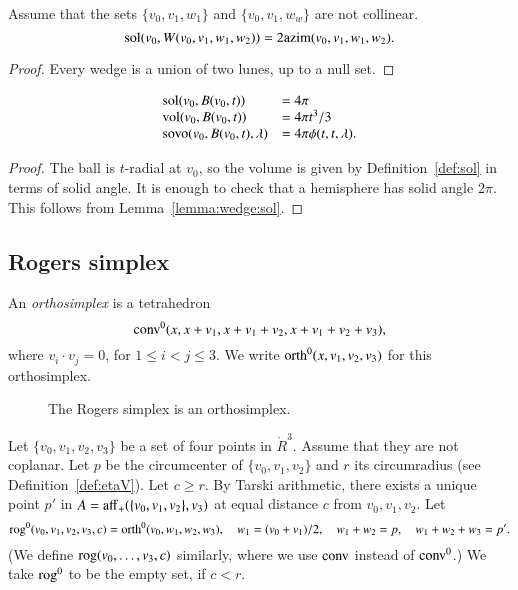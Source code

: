 \begin{lemma} 
Assume that the sets $\{v_0,v_1,w_1\}$ and
$\{v_0,v_1,w_w\}$ are not collinear. 
$$\operatorname{sol}(v_0,W(v_0,v_1,w_1,w_2)) = 2{\operatorname{azim}}(v_0,v_1,w_1,w_2).$$
\end{lemma}    

\begin{proof} Every wedge is a union of two lunes, up to a null set.
\end{proof}

\begin{lemma}  
   $$
   \begin{array}{lll}
    {\operatorname{sol}}(v_0,B(v_0,t)) &= 4\pi\\
    {\operatorname{vol}}(v_0,B(v_0,t)) &= 4\pi t^3/3\\
    {\operatorname{sovo}}(v_0,B(v_0,t),\lambda) &= 4 \pi \phi(t,t,\lambda).
   \end{array}
   $$
\end{lemma}

\begin{proof}
The ball is $t$-radial at $v_0$, so the volume is given by
Definition~\ref{def:sol} in terms of solid angle.  It is enough
to check that a hemisphere has solid angle $2\pi$.  This follows
from Lemma~\ref{lemma:wedge:sol}.
\end{proof}  




\subsection{Rogers simplex}

\begin{definition} 
An {\it orthosimplex} is a tetrahedron
    $${\operatorname{conv}}^0(x,x+v_1,x+v_1+v_2,x+v_1+v_2+v_3),$$
where $v_i\cdot v_j=0$, for $1\le i<j\le 3$.   We write
${\operatorname{orth}}^0(x,v_1,v_2,v_3)$ for this orthosimplex.
\end{definition}

\begin{figure}[htb]
  \centering
  \caption{The Rogers simplex is an orthosimplex.}
\end{figure}


\begin{definition} 
Let $\{v_0,v_1,v_2,v_3\}$ be a set of four points in $\ring{R}^3$.
Assume that they are not coplanar.  Let $p$ be the circumcenter
of $\{v_0,v_1,v_2\}$ and $r$ its circumradius (see Definition~\ref{def:etaV}).  Let $c\ge r$.
By Tarski arithmetic, there exists a unique
point $p'$ in $A={\operatorname{aff}}_+(\{v_0,v_1,v_2\},v_3)$ at equal distance $c$
from $v_0,v_1,v_2$.
Let $$
    {\operatorname{rog}}^0(v_0,v_1,v_2,v_3,c) = 
    {\operatorname{orth}}^0(v_0,w_1,w_2,w_3),
    \quad w_1=(v_0+v_1)/2,\quad w_1+w_2=p,\quad w_1+w_2+w_3=p'.
    $$
(We define ${\operatorname{rog}}(v_0,\ldots,v_3,c)$ similarly, where we use
${\operatorname{conv}}$ instead of ${\operatorname{conv}}^0$.)
We take ${\operatorname{rog}}^0$ to be the empty set, if $c< r$.
\end{definition}

